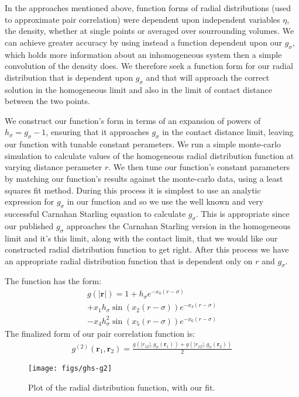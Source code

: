 \documentclass[letterpaper,twocolumn,amsmath,amssymb,pre,aps,10pt]{revtex4-1}
\newcommand{\rr}{\textbf{r}}
\begin{document}
In the approaches mentioned above, function forms of radial
distributions (used to approximate pair correlation) were dependent
upon independent variables $\eta$, the density, whether at single
points or averaged over sourrounding volumes.  We can achieve greater
accuracy by using instead a function dependent upon our $g_{\sigma}$,
which holds more information about an inhomogeneous system
then a simple convolution of the density does.  We therefore seek a function form for
our radial distribution that is dependent upon $g_{\sigma}$ and that
will approach the correct solution in the homogeneous limit and also
in the limit of contact distance between the two points.

We construct our function's form in terms of an expansion of powers of
$h_{\sigma} = g_{\sigma}-1$, ensuring that it approaches $g_{\sigma}$
in the contact distance limit, leaving our function with tunable
constant perameters.  We run a simple monte-carlo simulation to
calculate values of the homogeneous radial distribution function at
varying distance perameter $r$.  We then tune our function's constant
parameters by matching our function's results against the monte-carlo
data, using a least squares fit method.  During this process it is
simplest to use an analytic expression for $g_{\sigma}$ in our
function and so we use the well known and very successful Carnahan
Starling equation to calculate $g_{\sigma}$.  This is appropriate
since our published $g_{\sigma}$ approaches the Carnahan Starling
version in the homogeneous limit and it's this limit, along with the
contact limit, that we would like our constructed radial distribution
function to get right.  After this process we have an appropriate
radial distribution function that is dependent only on $r$ and
$g_{\sigma}$.

The function has the form:
\begin{multline}
  g(|\rr|) = 1 + h_{\sigma}e^{-x_0(r-\sigma)} \\+ x_1h_{\sigma}\sin(x_2(r-\sigma))e^{-x_3(r-\sigma)}\\
  -x_4h_{\sigma}^2\sin(x_5(r-\sigma))e^{-x_6(r-\sigma)}
\end{multline}
The finalized form of our pair correlation function is:
\begin{align}
  g^{(2)}(\rr_1,\rr_2) = \frac{g(|r_{12}|, g_\sigma(\rr_1)) + g(|r_{12}|, g_\sigma(\rr_2))}{2}
\end{align}

\begin{figure}
  \centering
  \texttt{[image: figs/ghs-g2]}%
  \caption{Plot of the radial distribution function, with our fit.}\label{fig:radial-distribution}
\end{figure}
\end{document}
